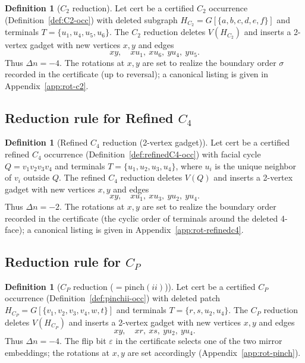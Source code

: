 \documentclass[12pt]{article}
\theoremstyle{definition}
\newtheorem{definition}[theorem]{Definition}
\newcommand{\RefinedCFourGadgetVertices}{2}
\newcommand{\CtwoGadgetVertices}{2}
\newcommand{\PinchGadgetVertices}{2}
\newcommand{\CtwoDelta}{-4}
\newcommand{\RefinedCfourDelta}{-2}
\newcommand{\PinchIIGadgetDelta}{-4}
\begin{document}
\begin{definition}[$C_2$ reduction]
\label{def:red-c2}
Let $\mathrm{cert}$ be a certified $C_2$ occurrence (Definition~\ref{def:C2-occ}) with deleted subgraph
$H_{C_2}=G[\{a,b,c,d,e,f\}]$ and terminals $T=\{u_1,u_4,u_5,u_6\}$.
The $C_2$ reduction deletes $V(H_{C_2})$ and inserts a \CtwoGadgetVertices-vertex gadget with new vertices $x,y$ and edges
\[
xy,\quad xu_1,\ xu_6,\ yu_4,\ yu_5.
\]
Thus $\Delta n=\CtwoDelta$.
The rotations at $x,y$ are set to realize the boundary order $\sigma$ recorded in the certificate (up to reversal); a canonical listing is given in Appendix~\ref{app:rot-c2}.
\end{definition}

\subsection{Reduction rule for \texorpdfstring{Refined $C_4$}{Refined C4}}
\label{subsec:red-c4}

\begin{definition}[Refined $C_4$ reduction (\RefinedCFourGadgetVertices-vertex gadget)]
\label{def:red-c4}
Let $\mathrm{cert}$ be a certified refined $C_4$ occurrence (Definition~\ref{def:refinedC4-occ}) with facial cycle
$Q=v_1v_2v_3v_4$ and terminals $T=\{u_1,u_2,u_3,u_4\}$, where $u_i$ is the unique neighbor of $v_i$ outside $Q$.
The refined $C_4$ reduction deletes $V(Q)$ and inserts a \RefinedCFourGadgetVertices-vertex gadget with new vertices $x,y$ and edges
\[
xy,\quad xu_1,\ xu_3,\ yu_2,\ yu_4.
\]
Thus $\Delta n=\RefinedCfourDelta$.
The rotations at $x,y$ are set to realize the boundary order recorded in the certificate (the cyclic order of terminals around the deleted 4-face); a canonical listing is given in Appendix~\ref{app:rot-refinedc4}.
\end{definition}

\subsection{Reduction rule for \texorpdfstring{$C_P$}{CPinch(ii)}}
\label{subsec:red-pinch}

\begin{definition}[$C_P$ reduction ($=\mathrm{pinch}(ii)$)]
\label{def:red-pinch}
Let $\mathrm{cert}$ be a certified $C_P$ occurrence (Definition~\ref{def:pinchii-occ}) with deleted patch
$H_{C_P}=G[\{v_1,v_2,v_3,v_4,w,t\}]$ and terminals $T=\{r,s,u_2,u_4\}$.
The $C_P$ reduction deletes $V(H_{C_P})$ and inserts a \PinchGadgetVertices-vertex gadget with new vertices $x,y$ and edges
\[
xy,\quad xr,\ xs,\ yu_2,\ yu_4.
\]
Thus $\Delta n=\PinchIIGadgetDelta$.
The flip bit $\varepsilon$ in the certificate selects one of the two mirror embeddings; the rotations at $x,y$ are set accordingly (Appendix~\ref{app:rot-pinch}).
\end{definition}
\end{document}
